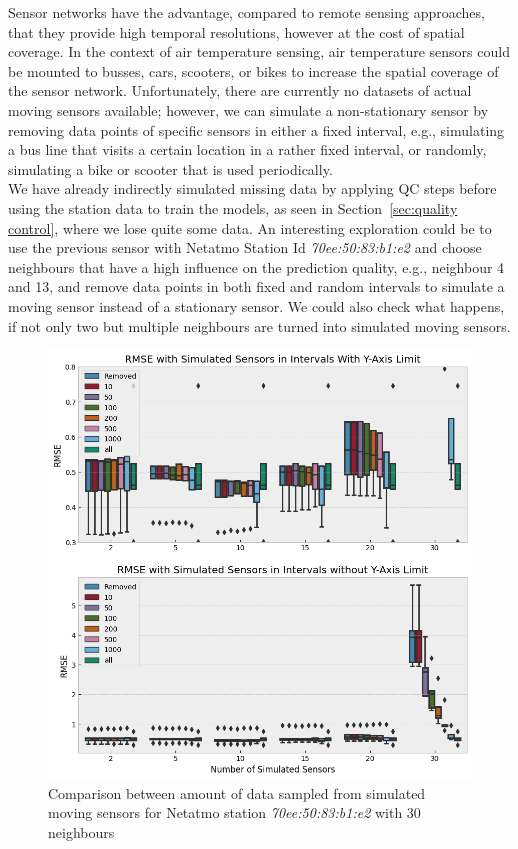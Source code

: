 
Sensor networks have the advantage, compared to remote sensing approaches, that they provide high temporal resolutions, however at the cost of spatial coverage. In the context of air temperature sensing, air temperature sensors could be mounted to busses, cars, scooters, or bikes to increase the spatial coverage of the sensor network. Unfortunately, there are currently no datasets of actual moving sensors available; however, we can simulate a non-stationary sensor by removing data points of specific sensors in either a fixed interval, e.g., simulating a bus line that visits a certain location in a rather fixed interval, or randomly, simulating a bike or scooter that is used periodically.\\
We have already indirectly simulated missing data by applying QC steps before using the station data to train the models, as seen in Section~\ref{sec:quality control}, where we lose quite some data. An interesting exploration could be to use the previous sensor with Netatmo Station Id \textit{70ee:50:83:b1:e2} and choose neighbours that have a high influence on the prediction quality, e.g., neighbour 4 and 13, and remove data points in both fixed and random intervals to simulate a moving sensor instead of a stationary sensor. We could also check what happens, if not only two but multiple neighbours are turned into simulated moving sensors.\\

\begin{figure}[ht]
    \centering
    \includegraphics[width=1\textwidth]{images/eval_moving_sensors_hamburg.png}
    \caption{Comparison between amount of data sampled from simulated moving sensors for Netatmo station \textit{70ee:50:83:b1:e2} with 30 neighbours}
    \label{fig:eval moving sensors}
\end{figure}


